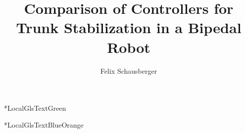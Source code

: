 \usepackage{xspace}%
\def\eg{e.g.\@\xspace}%
\def\ie{i.e.\@\xspace}%
%
\usepackage{float}%
%
\usepackage{standalone}%
\usepackage{subcaption}%
\usetikzlibrary{3d, angles, datavisualization.formats.functions, decorations.text, calc, patterns, positioning, quotes}%
%
%
\usepackage[per-mode=fraction]{siunitx}%
\DeclareSIUnit[quantity-product = {}]
%
\usepackage[acronyms, sanitizesort]{glossaries-extra}
\makenoidxglossaries%
%
\newcommand*{\LocalGlsOrange}[1]{\textcolor{TUMOrange}{#1}}%
\newcommand*{\LocalGlsGreen}[1]{\textcolor{TUMGreen}{#1}}%
\newcommand*{\LocalGlsBlue}[1]{\textcolor{TUMBlue}{#1}}%
\newcommand*{\LocalGlsBlueOrange}[1]{\textcolor{TUMBlue2!70!TUMOrange}{#1}}%

\newenvironment*{LocalGlsTextOrange}{%
  \let\oldglstextformat\glstextformat
  \renewcommand\glstextformat[1]{\LocalGlsOrange{##1}}%
}

\newenvironment*{LocalGlsTextGreen}{%
  \let\oldglstextformat\glstextformat
  \renewcommand\glstextformat[1]{\LocalGlsGreen{##1}}%
}

\newenvironment*{LocalGlsTextBlue}{%
  \let\oldglstextformat\glstextformat
  \renewcommand\glstextformat[1]{\LocalGlsBlue{##1}}%
}

\newenvironment*{LocalGlsTextBlueOrange}{%
  \let\oldglstextformat\glstextformat
  \renewcommand\glstextformat[1]{\LocalGlsBlueOrange{##1}}%
}

%
%
\graphicspath{{figures/}}%
%
%
\title[Comparison of Controllers for Trunk Stabilization in a Bipedal Robot]{Comparison of Controllers for Trunk Stabilization in a Bipedal Robot}%
\def\PresentationType{\AMlangGerEng{Abschlussvortrag}{Final Presentation}}%
\def\PresentationThesisType{\AMlangMastersThesis}%
\author[F. Schausberger]{Felix Schausberger}%
\def\PresentationExaminer{Dr.-Ing. Daniel Renjewski}%
\def\PresentationSupervisor{Dr.-Ing. Daniel Renjewski}%
\date{}%